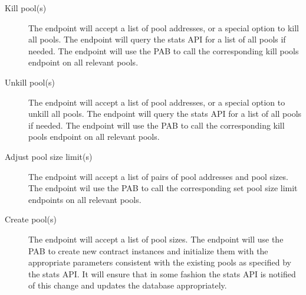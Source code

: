 \documentclass[12pt]{article}
\begin{document}
\begin{description}
	\item[Kill pool(s)] The endpoint will accept a list of pool addresses, or a special option to kill all pools. The endpoint will query the stats API for a list of all pools if needed. The endpoint will use the PAB to call the corresponding kill pools endpoint on all relevant pools.
	\item[Unkill pool(s)] The endpoint will accept a list of pool addresses, or a special option to unkill all pools. The endpoint will query the stats API for a list of all pools if needed. The endpoint will use the PAB to call the corresponding kill pools endpoint on all relevant pools.
	\item[Adjust pool size limit(s)] The endpoint will accept a list of pairs of pool addresses and pool sizes. The endpoint wil use the PAB to call the corresponding set pool size limit endpoints on all relevant pools.
	\item[Create pool(s)] The endpoint will accept a list of pool sizes. The endpoint will use the PAB to create new contract instances and initialize them with the appropriate parameters consistent with the existing pools as specified by the stats API. It will ensure that in some fashion the stats API is notified of this change and updates the database appropriately.
\end{description}
\end{document}
